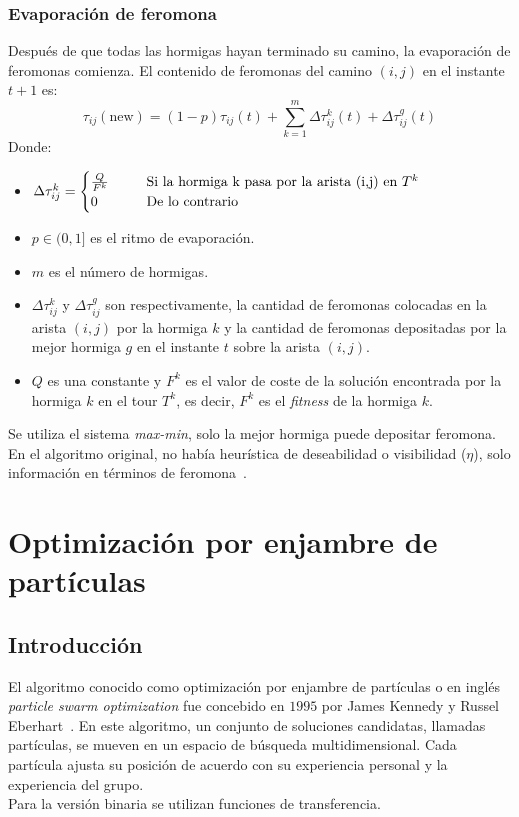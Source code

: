 \subsubsection{Evaporación de feromona}
Después de que todas las hormigas hayan terminado su camino, la evaporación de feromonas comienza. El contenido de feromonas del camino $(i,j)$ en el instante $t+1$ es:
\begin{equation}
    \tau_{ij}(\text{new})=(1-p)\tau_{ij}(t)+\sum_{k=1}^m\Delta\tau_{ij}^k(t)+\Delta\tau_{ij}^g(t)
\end{equation}
Donde:
\begin{itemize}
    \item $\Delta\tau_{ij}^k=\begin{cases}\frac{Q}{F^k}&\hspace{6mm}\text{Si la hormiga k pasa por la arista (i,j) en }T^k\\0 &\hspace{6mm}\text{De lo contrario}\end{cases}$
    \item $p\in (0,1]$ es el ritmo de evaporación.
    \item $m$ es el número de hormigas.
    \item $\Delta\tau_{ij}^k$ y $\Delta\tau_{ij}^g$ son respectivamente, la cantidad de feromonas colocadas en la arista $(i,j)$ por la hormiga $k$ y la cantidad de feromonas depositadas por la mejor hormiga $g$ en el instante $t$ sobre la arista $(i,j)$.
    \item $Q$ es una constante y $F^k$ es el valor de coste de la solución encontrada por la hormiga $k$ en el tour $T^k$, es decir, $F^k$ es el \textit{fitness} de la hormiga $k$.
\end{itemize}
Se utiliza el sistema \textit{max-min}, solo la mejor hormiga puede depositar feromona.\\[6pt]
En el algoritmo original, no había heurística de deseabilidad o visibilidad ($\eta$), solo información en términos de feromona~\cite{dorigo_ant_1999}.

\section{Optimización por enjambre de partículas}
\subsection{Introducción}
El algoritmo conocido como optimización por enjambre de partículas o en inglés \textit{particle swarm optimization} fue concebido en $1995$ por James Kennedy y Russel Eberhart~\cite{kennedy_particle_1995}. En este algoritmo, un conjunto de soluciones candidatas, llamadas partículas, se mueven en un espacio de búsqueda multidimensional. Cada partícula ajusta su posición de acuerdo con su experiencia personal y la experiencia del grupo.\\[6pt]
Para la versión binaria se utilizan funciones de transferencia.

